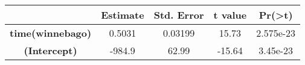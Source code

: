 \documentclass[]{book}
\theoremstyle{definition}
\theoremstyle{definition}
\theoremstyle{remark}
\begin{document}
\begin{longtable}[c]{@{}ccccc@{}}
\toprule
\begin{minipage}[b]{0.26\columnwidth}\centering\strut
~
\strut\end{minipage} &
\begin{minipage}[b]{0.13\columnwidth}\centering\strut
Estimate
\strut\end{minipage} &
\begin{minipage}[b]{0.16\columnwidth}\centering\strut
Std. Error
\strut\end{minipage} &
\begin{minipage}[b]{0.12\columnwidth}\centering\strut
t value
\strut\end{minipage} &
\begin{minipage}[b]{0.12\columnwidth}\centering\strut
Pr(\textgreater{}\textbar{}t\textbar{})
\strut\end{minipage}\tabularnewline
\midrule
\endhead
\begin{minipage}[t]{0.26\columnwidth}\centering\strut
\textbf{time(winnebago)}
\strut\end{minipage} &
\begin{minipage}[t]{0.13\columnwidth}\centering\strut
0.5031
\strut\end{minipage} &
\begin{minipage}[t]{0.16\columnwidth}\centering\strut
0.03199
\strut\end{minipage} &
\begin{minipage}[t]{0.12\columnwidth}\centering\strut
15.73
\strut\end{minipage} &
\begin{minipage}[t]{0.12\columnwidth}\centering\strut
2.575e-23
\strut\end{minipage}\tabularnewline
\begin{minipage}[t]{0.26\columnwidth}\centering\strut
\textbf{(Intercept)}
\strut\end{minipage} &
\begin{minipage}[t]{0.13\columnwidth}\centering\strut
-984.9
\strut\end{minipage} &
\begin{minipage}[t]{0.16\columnwidth}\centering\strut
62.99
\strut\end{minipage} &
\begin{minipage}[t]{0.12\columnwidth}\centering\strut
-15.64
\strut\end{minipage} &
\begin{minipage}[t]{0.12\columnwidth}\centering\strut
3.45e-23
\strut\end{minipage}\tabularnewline
\bottomrule
\end{longtable}
\end{document}
